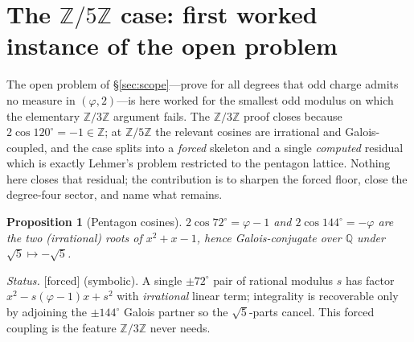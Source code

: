 \documentclass[11pt]{article}
\newtheorem{proposition}[theorem]{Proposition}
\theoremstyle{definition}
\theoremstyle{remark}
\newcommand{\Z}{\mathbb{Z}}
\newcommand{\Q}{\mathbb{Q}}
\newcommand{\gold}{\varphi}
\newcommand{\Zmod}[1]{\Z/#1\Z}
\newcommand{\status}[1]{{\small\textsf{[#1]}}}
\newcommand{\forced}{\status{forced}}
\begin{document}
\section{The \texorpdfstring{$\Zmod5$}{Z/5} case: first worked instance of the open problem}\label{sec:z5}

The open problem of \S\ref{sec:scope}---prove for all degrees that odd charge admits no measure
in $(\gold,2)$---is here worked for the smallest odd modulus on which the elementary $\Zmod3$
argument fails. The $\Zmod3$ proof closes because $2\cos120^\circ=-1\in\Z$; at $\Zmod5$ the
relevant cosines are irrational and Galois-coupled, and the case splits into a \emph{forced}
skeleton and a single \emph{computed} residual which is exactly Lehmer's problem restricted to
the pentagon lattice. Nothing here closes that residual; the contribution is to sharpen the
forced floor, close the degree-four sector, and name what remains.

\begin{proposition}[Pentagon cosines]\label{prop:pentcos}
$2\cos72^\circ=\gold-1$ and $2\cos144^\circ=-\gold$ are the two (irrational) roots of
$x^2+x-1$, hence Galois-conjugate over $\Q$ under $\sqrt5\mapsto-\sqrt5$.
\end{proposition}
\noindent\emph{Status.} \forced{} (symbolic). A single $\pm72^\circ$ pair of rational modulus
$s$ has factor $x^2-s(\gold-1)x+s^2$ with \emph{irrational} linear term; integrality is
recoverable only by adjoining the $\pm144^\circ$ Galois partner so the $\sqrt5$-parts cancel.
This forced coupling is the feature $\Zmod3$ never needs.
\end{document}

